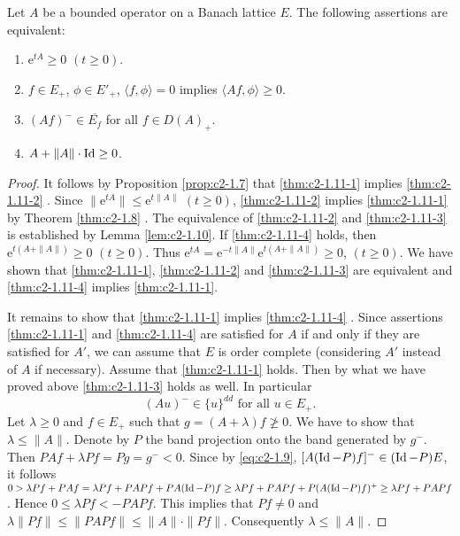 \begin{theorem}\label{thm:c2-1.11}
%
%
Let $A$ be a bounded operator on a Banach lattice $E$.
The following assertions are equivalent:
\begin{enumerate}[\upshape (a)]
\item \label{thm:c2-1.11-1}
$\mathrm{e}^{tA} \geq 0$ $(t \geq 0)$.
\item \label{thm:c2-1.11-2}
$f \in E_{+}$, $\phi \in E'_{+}$, $\langle f,\phi \rangle = 0$ implies $\langle Af,\phi \rangle \geq 0$.
\item \label{thm:c2-1.11-3}
$(Af)^{-} \in \overline{E_{f}}$ for all $f \in D(A)_{+}$.
\item \label{thm:c2-1.11-4}
$A + \|A\| \cdot \operatorname{Id} \geq 0$.
\end{enumerate}
\end{theorem}
\begin{proof}
It follows by Proposition \ref{prop:c2-1.7}   that  \ref{thm:c2-1.11-1}   implies \ref{thm:c2-1.11-2}  .
Since $\|\mathrm{e}^{tA}\| \leq \mathrm{e}^{t\|A\|}$ $(t\geq0)$, \ref{thm:c2-1.11-2}   implies \ref{thm:c2-1.11-1}   by Theorem \ref{thm:c2-1.8}   .
The equivalence of \ref{thm:c2-1.11-2}   and \ref{thm:c2-1.11-3}   is established by Lemma \ref{lem:c2-1.10}.
If \ref{thm:c2-1.11-4} holds, then $\mathrm{e}^{t(A+\|A\|)} \geq 0$ $(t\geq0)$.
Thus $\mathrm{e}^{tA} = \mathrm{e}^{-t\|A\|} \mathrm{e}^{t(A+\|A\|)} \geq 0$, $(t\geq0)$.
We have shown that \ref{thm:c2-1.11-1}, \ref{thm:c2-1.11-2}  and \ref{thm:c2-1.11-3} are equivalent and \ref{thm:c2-1.11-4}  implies \ref{thm:c2-1.11-1}.

It remains to show that \ref{thm:c2-1.11-1}  implies \ref{thm:c2-1.11-4}  .
Since assertions \ref{thm:c2-1.11-1}   and \ref{thm:c2-1.11-4}   are satisfied for $A$ if and only if they are satisfied for $A'$, we can assume that $E$ is order complete (considering $A'$ instead of $A$ if necessary).
Assume that \ref{thm:c2-1.11-1}   holds.
Then by what we have proved above \ref{thm:c2-1.11-3}   holds as well.
In particular
\begin{equation}\label{eq:c2-1.9}
(Au)^{-} \in \{u\}^{dd} \text{ for all } u \in E_{+}.
\end{equation}
Let $\lambda \geq 0$ and $f \in E_{+}$ such that $g = (A + \lambda)f \not\geq 0$.
We have to show that $\lambda \leq \|A\|$.
Denote by $P$ the band projection onto the band generated by $g^{-}$.
Then $PAf + \lambda Pf = Pg = g^{-} < 0$.
Since by  \eqref{eq:c2-1.9}, $[A(\operatorname{Id} - P)f]^{-} \in (\operatorname{Id} - P)E$, it follows 
$0 > \lambda Pf + PAf = \lambda Pf + PAPf + PA(\operatorname{Id}-P)f \geq \lambda Pf + PAPf + P(A(\operatorname{Id}-P)f)^{+} \geq \lambda Pf + PAPf$.
Hence $0 \leq \lambda Pf < -PAPf$.
This implies that $Pf \neq 0$ and $\lambda\|Pf\| \leq \|PAPf\| \leq \|A\|\cdot\|Pf\|$.
Consequently $\lambda \leq \|A\|$.
\end{proof}
